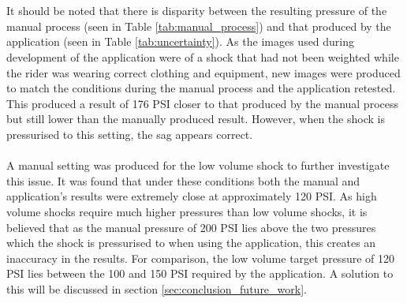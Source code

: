 			\\\\
			It should be noted that there is disparity between the resulting pressure of the manual process (seen in Table \ref{tab:manual_process}) and that produced by the application (seen in Table \ref{tab:uncertainty}). As the images used during development of the application were of a shock that had not been weighted while the rider was wearing correct clothing and equipment, new images were produced to match the conditions during the manual process and the application retested. This produced a result of 176 PSI closer to that produced by the manual process but still lower than the manually produced result. However, when the shock is pressurised to this setting, the sag appears correct. 
			\\\\
			A manual setting was produced for the low volume shock to further investigate this issue. It was found that under these conditions both the manual and application’s results were extremely close  at approximately 120 PSI. As high volume shocks require much higher pressures than low volume shocks, it is believed that as the manual pressure of 200 PSI lies above the two pressures which the shock is pressurised to when using the application, this creates an inaccuracy in the results. For comparison, the low volume target pressure of 120 PSI lies between the 100 and 150 PSI required by the application. A solution to this will be discussed in section \ref{sec:conclusion_future_work}.
